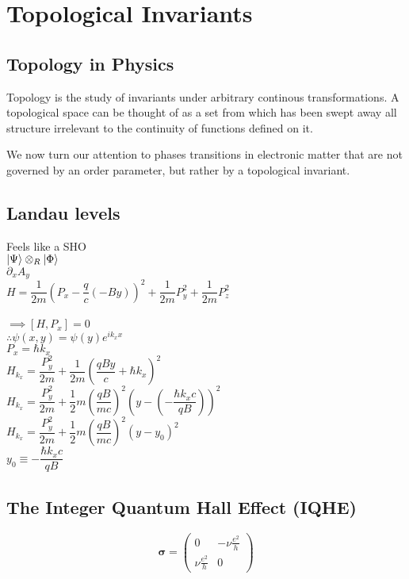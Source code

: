 \section{\label{sec:top-phases}Topological Invariants}

\subsection{\label{ssec:topo-intro}Topology in Physics}

Topology is the study of invariants under arbitrary continous transformations. 
A topological space can be thought of as a set from which has been swept away all structure irrelevant to the continuity of functions defined on it.

We now turn our attention to phases transitions in electronic matter that are not governed by an order parameter, but rather by a topological invariant.

\subsection{\label{ssec:landau-levels}Landau levels}
Feels like a SHO \\ 
$\ket{\Psi} \mathbin{\mathop{\otimes}\displaylimits_{R}} \ket{\Phi}$ \\
$\partial_{x}A_{y}$ \\
$H = \dfrac{1}{2m}\left(P_{x} - \dfrac{q}{c}\left(-By\right)\right)^{2} + \dfrac{1}{2m}P_{y}^{2} + \dfrac{1}{2m}P_{z}^{2}$ \\ \\
$ \implies \left[H,P_{x}\right] = 0$ \\
$\therefore \psi(x,y) = \psi(y) e^{ik_{x}x}$ \\
$P_{x} = \hbar k_{x}$ \\
$H_{k_{x}} = \dfrac{P_{y}^{2}}{2m} + \dfrac{1}{2m}\left(\dfrac{qBy}{c} + \hbar k_{x}\right)^{2}  $ \\
$H_{k_{x}} = \dfrac{P_{y}^{2}}{2m} + \dfrac{1}{2} m \left(\dfrac{qB}{mc}\right)^{2} \left(y - \left(- \dfrac{\hbar k_{x} c}{qB}\right)\right)^{2} $ \\
$H_{k_{x}} = \dfrac{P_{y}^{2}}{2m} + \dfrac{1}{2} m \left(\dfrac{qB}{mc}\right)^{2} \left(y - y_{0}\right)^{2} $ \\
$y_{0} \equiv - \dfrac{\hbar k_{x} c}{qB}$

\subsection{\label{ssec:iqhe}The Integer Quantum Hall Effect (IQHE)}
$$
\boldsymbol{\sigma}=\left(\begin{array}{cc}
    0 & -\nu \frac{e^{2}}{h} \\
    \nu \frac{e^{2}}{h} & 0
    \end{array}\right)
$$


